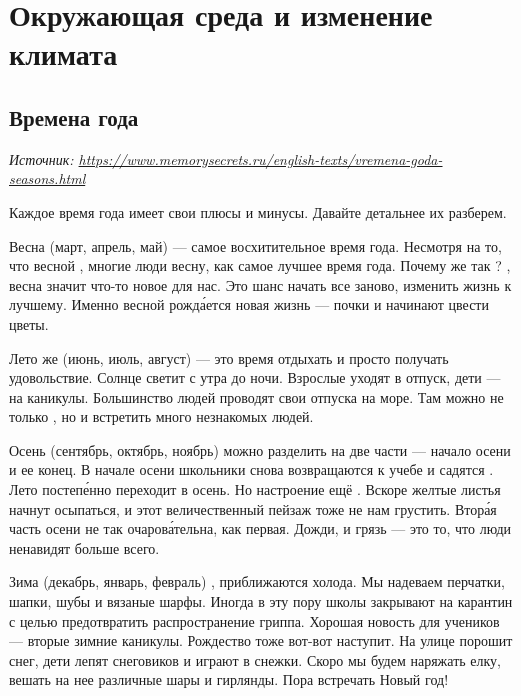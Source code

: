 \chapter{Окружающая среда и изменение климата}

\section{Времена года}
\textit{Источник: \url{https://www.memorysecrets.ru/english-texts/vremena-goda-seasons.html}}

Каждое время года имеет свои плюсы и минусы. Давайте детальнее их разберем.

Весна (март, апрель, май) --- самое восхитительное время года. Несмотря на то, что весной  , многие люди  весну, как самое лучшее время года. Почему же так ? , весна значит что-то новое для нас. Это шанс начать все заново, изменить жизнь к лучшему. Именно весной рожд\'{а}ется новая жизнь ---  почки и начинают цвести цветы.

Лето же (июнь, июль, август) --- это время отдыхать и просто получать удовольствие. Солнце светит с утра до ночи. Взрослые уходят в отпуск, дети --- на каникулы. Большинство людей проводят свои отпуска на море. Там можно не только , но и встретить много незнакомых людей.

Осень (сентябрь, октябрь, ноябрь) можно разделить на две части --- начало осени и ее конец. В начале осени школьники снова возвращаются к учебе и садятся . Лето постеп\'{е}нно переходит в осень. Но настроение ещё . Вскоре желтые листья начнут осыпаться, и этот величественный пейзаж тоже не  нам грустить. Втор\'{а}я часть осени не так очаров\'{а}тельна, как первая. Дожди,  и грязь --- это то, что люди ненавидят больше всего.

Зима (декабрь, январь, февраль) , приближаются холода. Мы надеваем перчатки, шапки, шубы и вязаные шарфы. Иногда в эту пору школы закрывают на карантин с целью предотвратить распространение гриппа. Хорошая новость для учеников --- вторые зимние каникулы. Рождество тоже вот-вот наступит. На улице порошит снег, дети лепят снеговиков и играют в снежки. Скоро мы будем наряжать елку, вешать на нее различные шары и гирлянды. Пора встречать Новый год!

